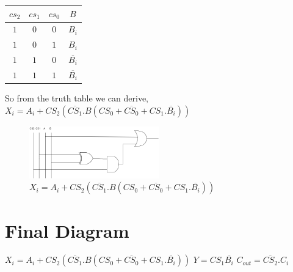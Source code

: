 \documentclass[]{article}
\begin{document}
	\begin{center}
		\begin{tabular}{|c|c|c|c|}
			\hline
			$cs_2$ & $cs_1$ & $cs_0$ & $B$ \\
			\hline
			
			\hline
			$1$ & $0$ & $0$ & $B_i$ \\
			\hline
			
			\hline
			$1$ & $0$ & $1$ & $B_i$ \\
			\hline
			
			\hline
			$1$ & $1$ & $0$ & $\overline{B_i}$ \\
			\hline
			
			\hline
			$1$ & $1$ & $1$ & $\overline{B_i}$ \\
			\hline
		\end{tabular}
	\end{center}
	So from the truth table we can derive, \newline
	$X_i=A_i+CS_2(\overline{CS_1}.B(CS_0 + \overline{CS_0}+CS_1.\overline{B_i}) )$ 
	
	\begin{figure}[h]
		\centering
		\includegraphics[width = 0.5\textwidth]{image/ckt2.png}
		\caption{
			$X_i=A_i+CS_2(\overline{CS_1}.B(CS_0 + \overline{CS_0}+CS_1.\overline{B_i}) )$
		}
		\label{fig:ckt1}
		
	\end{figure}

	\section{Final Diagram}
	$X_i=A_i+CS_2(\overline{CS_1}.B(CS_0 + \overline{CS_0}+CS_1.\overline{B_i}) )$\newline
	$Y=CS_1\overline{B_i}$\newline
	$C_{out}=\overline{CS_2}.C_i$ 
	
	
\end{document}
